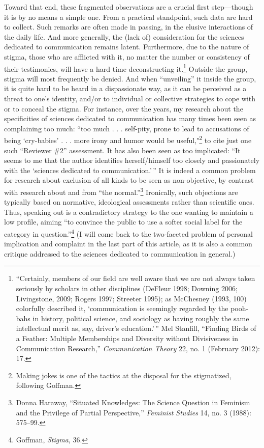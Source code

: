 \documentclass{tufte-handout}
\begin{document}
Toward that end, these fragmented observations are a crucial first
step---though it is by no means a simple one. From a practical
standpoint, such data are hard to collect. Such remarks are often made
in passing, in the elusive interactions of the daily life. And more
generally, the (lack of) consideration for the sciences dedicated to
communication remains latent. Furthermore, due to the nature of stigma,
those who are afflicted with it, no matter the number or consistency of
their testimonies, will have a hard time deconstructing it.\footnote{``Certainly,
  members of our field are well aware that we are not always taken
  seriously by scholars in other disciplines (DeFleur 1998; Downing
  2006; Livingstone, 2009; Rogers 1997; Streeter 1995); as McChesney
  (1993, 100) colorfully described it, `communication is seemingly
  regarded by the pooh-bahs in history, political science, and sociology
  as having roughly the same intellectual merit as, say, driver's
  education.'\,'' Mel Stanfill, ``Finding Birds of a Feather: Multiple
  Memberships and Diversity without Divisiveness in Communication
  Research,'' \emph{Communication Theory} 22, no. 1 (February 2012): 17.}
Outside the group, stigma will most frequently be denied. And when
``unveiling'' it inside the group, it is quite hard to be heard in a
dispassionate way, as it can be perceived as a threat to one's identity,
and/or to individual or collective strategies to cope with or to conceal
the stigma. For instance, over the years, my research about the
specificities of sciences dedicated to communication has many times been
seen as complaining too much: ``too much . . . self-pity, prone to lead
to accusations of being `cry-babies' . . . more irony and humor would be
useful,"\footnote{Making jokes is one of the tactics at the disposal for
  the stigmatized, following Goffman.} to cite just one such ``Reviewer
\#2'' assessment. It has also been seen as too implicated: ``It seems to
me that the author identifies herself/himself too closely and
passionately with the `sciences dedicated to communication.'\,'' It is
indeed a common problem for research about exclusion of all kinds to be
seen as non-objective, by contrast with research about and from ``the
normal.''\footnote{Donna Haraway, ``Situated Knowledges: The Science
  Question in Feminism and the Privilege of Partial Perspective,''
  \emph{Feminist Studies} 14, no. 3 (1988): 575--99.} Ironically, such
objections are typically based on normative, ideological assessments
rather than scientific ones. Thus, speaking out is a contradictory
strategy to the one wanting to maintain a low profile, aiming ``to
convince the public to use a softer social label for the category in
question.''\footnote{Goffman, \emph{Stigma}, 36.} (I will come back to
the two-faceted problem of personal implication and complaint in the
last part of this article, as it is also a common critique addressed to
the sciences dedicated to communication in general.)
\end{document}
